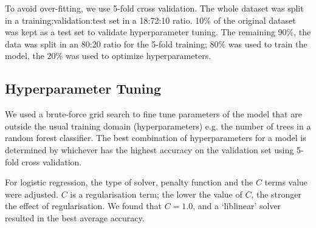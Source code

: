 To avoid over-fitting, we use 5-fold cross validation. The whole dataset was split in a training:validation:test set in a 18:72:10 ratio. 10\% of the original dataset was kept as a test set to validate hyperparameter tuning. The remaining 90\%, the data was split in an 80:20 ratio for the 5-fold training; 80\% was used to train the model, the 20\% was used to optimize hyperparameters. %

\subsection{Hyperparameter Tuning} \label{hpt}
We used a brute-force grid search to fine tune parameters of the model that are outside the usual training domain (hyperparameters) e.g. the number of trees in a random forest classifier.
The best combination of hyperparameters for a model is determined by whichever has the highest accuracy on the validation set using 5-fold cross validation.

For logistic regression, the type of solver, penalty function and the $C$  terms value were adjusted. $C$ is a regularisation term; 
the lower the value of $C$, the stronger the effect of regularisation. We found that  $C=1.0$, and a `liblinear' solver resulted in the best average accuracy.


